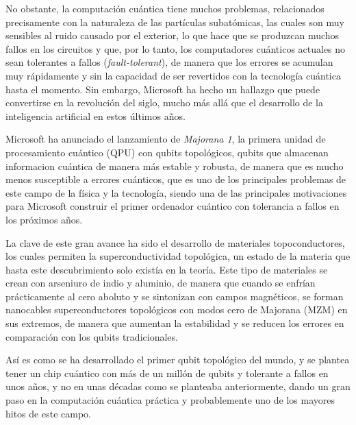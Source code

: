 \documentclass{article}
\numberwithin{equation}{section} %
\begin{document}
    \vspace{5mm}

    No obstante, la computación cuántica tiene muchos problemas, relacionados precisamente con la naturaleza de las partículas subatómicas, las cuales son muy sensibles al ruido causado por el exterior, lo que hace que se produzcan muchos fallos en los circuitos y que, por lo tanto, los computadores cuánticos actuales no sean tolerantes a fallos (\textit{fault-tolerant}), de manera que los errores se acumulan muy rápidamente y sin la capacidad de ser revertidos con la tecnología cuántica hasta el momento. Sin embargo, Microsoft ha hecho un hallazgo que puede convertirse en la revolución del siglo, mucho más allá que el desarrollo de la inteligencia artificial en estos últimos años.

    \vspace{5mm}

    Microsoft ha anunciado el lanzamiento de \textit{Majorana 1}, la primera unidad de procesamiento cuántico (QPU) con qubits topológicos, qubits que almacenan informacion cuántica de manera más estable y robusta, de manera que es mucho menos susceptible a errores cuánticos, que es uno de los principales problemas de este campo de la física y la tecnología, siendo una de las principales motivaciones para Microsoft construir el primer ordenador cuántico con tolerancia a fallos en los próximos años.

    \vspace{5mm}

    La clave de este gran avance ha sido el desarrollo de materiales topoconductores, los cuales permiten la superconductividad topológica, un estado de la materia que hasta este descubrimiento solo existía en la teoría. Este tipo de materiales se crean con arseniuro de indio y aluminio, de manera que cuando se enfrían prácticamente al cero aboluto y se sintonizan con campos magnéticos, se forman nanocables superconductores topológicos con modos cero de Majorana (MZM) en sus extremos, de manera que aumentan la estabilidad y se reducen los errores en comparación con los qubits tradicionales.
    \vspace{5mm}

    Así es como se ha desarrollado el primer qubit topológico del mundo, y se plantea tener un chip cuántico con más de un millón de qubits y tolerante a fallos en unos años, y no en unas décadas como se planteaba anteriormente, dando un gran paso en la computación cuántica práctica y probablemente uno de los mayores hitos de este campo.
\end{document}
